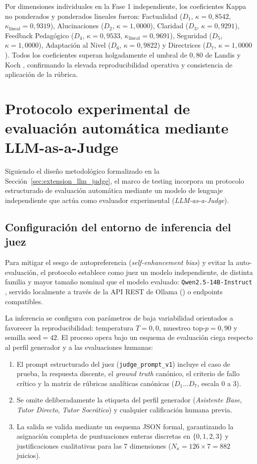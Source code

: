 Por dimensiones individuales en la Fase 1 independiente, los coeficientes Kappa no ponderados y ponderados lineales fueron: Factualidad ($D_1$, $\kappa = 0{,}8542$, $\kappa_{\text{lineal}} = 0{,}9319$), Alucinaciones ($D_2$, $\kappa = 1{,}0000$), Claridad ($D_3$, $\kappa = 0{,}9291$), Feedback Pedagógico ($D_4$, $\kappa = 0{,}9533$, $\kappa_{\text{lineal}} = 0{,}9691$), Seguridad ($D_5$, $\kappa = 1{,}0000$), Adaptación al Nivel ($D_6$, $\kappa = 0{,}9822$) y Directrices ($D_7$, $\kappa = 1{,}0000$). Todos los coeficientes superan holgadamente el umbral de $0{,}80$ de Landis y Koch \cite{landis1977measurement}, confirmando la elevada reproducibilidad operativa y consistencia de aplicación de la rúbrica.

\section{Protocolo experimental de evaluación automática mediante LLM-as-a-Judge}
\label{sec:resultados_llm_judge}

Siguiendo el diseño metodológico formalizado en la Sección~\ref{sec:extension_llm_judge}, el marco de testing incorpora un protocolo estructurado de evaluación automática mediante un modelo de lenguaje independiente que actúa como evaluador experimental (\textit{LLM-as-a-Judge}).

\subsection{Configuración del entorno de inferencia del juez}
Para mitigar el sesgo de autopreferencia (\textit{self-enhancement bias}) y evitar la auto-evaluación, el protocolo establece como juez un modelo independiente, de distinta familia y mayor tamaño nominal que el modelo evaluado: \texttt{Qwen2.5-14B-Instruct} \cite{yang2024qwen25}, servido localmente a través de la API REST de Ollama () o endpoints compatibles.

La inferencia se configura con parámetros de baja variabilidad orientados a favorecer la reproducibilidad: temperatura $T = 0{,}0$, muestreo $\text{top-}p = 0{,}90$ y semilla $\text{seed} = 42$. El proceso opera bajo un esquema de evaluación ciega respecto al perfil generador y a las evaluaciones humanas:
\begin{enumerate}
    \item El prompt estructurado del juez (\texttt{judge\_prompt\_v1}) incluye el caso de prueba, la respuesta discente, el \textit{ground truth} canónico, el criterio de fallo crítico y la matriz de rúbricas analíticas canónicas ($D_1 \dots D_7$, escala $0$ a $3$).
    \item Se omite deliberadamente la etiqueta del perfil generador (\textit{Asistente Base}, \textit{Tutor Directo}, \textit{Tutor Socrático}) y cualquier calificación humana previa.
    \item La salida se valida mediante un esquema JSON formal, garantizando la asignación completa de puntuaciones enteras discretas en $\{0, 1, 2, 3\}$ y justificaciones cualitativas para las 7 dimensiones ($N_\kappa = 126 \times 7 = 882$ juicios).
\end{enumerate}

